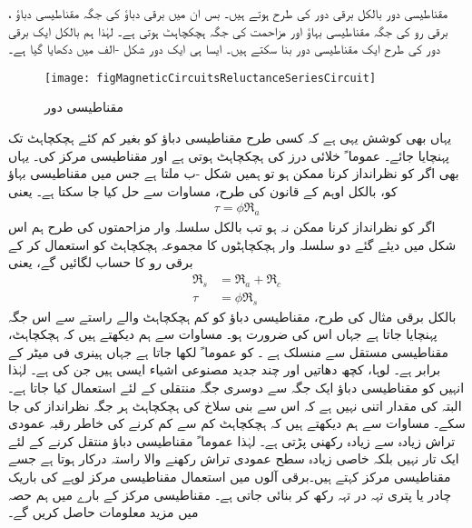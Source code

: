 مقناطیسی دور بالکل برقی دور کی طرح ہوتے ہیں۔ بس ان میں برقی دباؤ  کی جگہ مقناطیسی دباؤ  ، برقی رو   کی جگہ مقناطیسی بہاؤ   اور مزاحمت  کی جگہ  ہچکچاہٹ   ہوتی ہے۔ لہٰذا ہم بالکل ایک برقی دور کی طرح ایک مقناطیسی دور بنا سکتے ہیں۔ ایسا ہی ایک دور شکل -الف میں دکھایا گیا ہے۔
\begin{figure}
\centering
\texttt{[image: figMagneticCircuitsReluctanceSeriesCircuit]}
\caption{مقناطیسی دور}
\label{شکل_مقناطیسی__مقناطیسی_سلسلہ_وار_دور}
\end{figure}
%
یہاں بھی کوشش یہی ہے کہ کسی طرح مقناطیسی دباؤ  کو بغیر کم کئے ہچکچاہٹ  تک پہنچایا جائے۔ عموما ً  خلائی درز کی ہچکچاہٹ ہوتی ہے اور  مقناطیسی مرکز کی۔ یہاں بھی اگر  کو نظرانداز کرنا ممکن ہو تو ہمیں شکل -ب ملتا ہے جس میں مقناطیسی بہاؤ  کو، بالکل اوہم کے قانون کی طرح، مساوات سے حل کیا جا سکتا ہے۔ یعنی
\begin{align}
\tau=\phi \Re_a
\end{align}
 اگر  کو نظرانداز کرنا ممکن نہ ہو تب بالکل سلسلہ وار مزاحمتوں کی طرح ہم اس شکل میں دیئے گئے دو سلسلہ وار ہچکچاہٹوں کا مجموعہ ہچکچاہٹ   کو استعمال کر کے برقی رو کا حساب لگائیں گے، یعنی
\begin{align}
\Re_s&=\Re_a+\Re_c\\
\tau&=\phi \Re_s
\end{align}
	بالکل برقی مثال کی طرح، مقناطیسی دباؤ کو کم ہچکچاہٹ والے راستے سے اس جگہ پہنچایا جاتا ہے جہاں اس کی ضرورت ہو۔ مساوات سے ہم دیکھتے ہیں کہ ہچکچاہٹ،  مقناطیسی مستقل  سے منسلک ہے ۔ کو عموما ً  لکھا جاتا ہے جہاں   ہینری فی میٹر  کے برابر ہے۔ لوہا،  کچھ دھاتیں اور چند جدید مصنوعی اشیاء  ایسی ہیں جن کی  ہے۔ لہٰذا انہیں کو مقناطیسی دباؤ  ایک جگہ سے دوسری جگہ منتقلی کے لئے استعمال کیا جاتا ہے۔ البتہ  کی مقدار اتنی نہیں ہے کہ اس سے بنی سلاخ کی ہچکچاہٹ ہر جگہ نظرانداز کی جا سکے۔ مساوات  سے ہم دیکھتے ہیں کہ ہچکچاہٹ کم سے کم کرنے کی خاطر رقبہ عمودی تراش زیادہ سے زیادہ رکھنی پڑتی ہے۔ لہٰذا عموما ً مقناطیسی دباؤ منتقل کرنے کے لئے ایک تار نہیں بلکہ خاصی زیادہ سطح عمودی تراش رکھنے والا راستہ  درکار ہوتا ہے جسے مقناطیسی مرکز کہتے ہیں۔برقی آلوں میں استعمال  مقناطیسی مرکز لوہے کی باریک چادر یا پتری  تہہ  در تہہ رکھ کر بنائی جاتی ہے۔ مقناطیسی مرکز کے بارے میں ہم حصہ  میں مزید معلومات حاصل کریں گے۔

